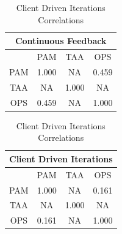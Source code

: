 \begin{table} [H]
 \RawFloats %
 \begin{minipage}{.45\textwidth}
  \caption{Continuous Feedback Correlations}
  \label{table:cf_correlations}
   \begin{tabular}{| c | c | c | c |} \hline
   \multicolumn{4}{|c|}{\textbf{Continuous Feedback}}  \\ \hline
   & PAM & TAA & OPS \\ \hline
   PAM & 1.000 & NA & 0.459 \\ \hline
   TAA & NA & 1.000 & NA \\ \hline
   OPS & 0.459 & NA & 1.000 \\ \hline
  \end{tabular}
 \end{minipage}%
%
 \begin{minipage}{.45\textwidth}
  \centering
  \caption{Client Driven Iterations Correlations}
  \label{table:cdi_correlations}
  \begin{tabular}{| c | c | c | c |} \hline
  \multicolumn{4}{|c|}{\textbf{Client Driven Iterations}}  \\ \hline
   & PAM & TAA & OPS \\ \hline
  PAM & 1.000 & NA & 0.161 \\ \hline
  TAA & NA & 1.000 & NA \\ \hline
  OPS & 0.161 & NA & 1.000 \\ \hline
 \end{tabular}
 \end{minipage}%
\end{table}


